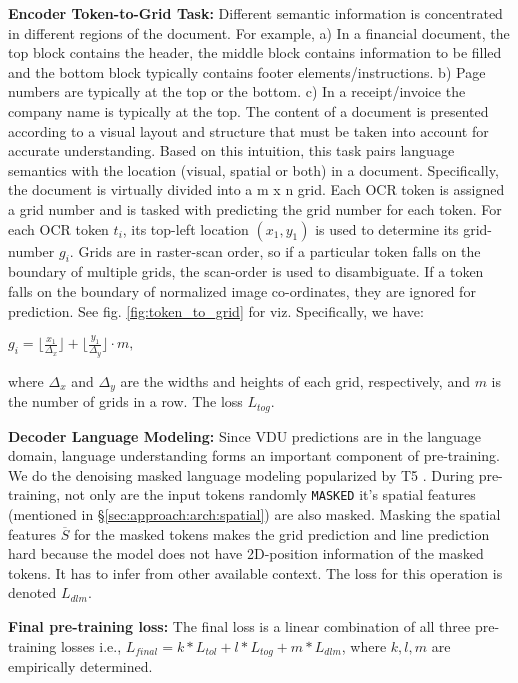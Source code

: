 \documentclass[10pt,twocolumn,letterpaper]{article}
\begin{document}
\label{sec:approach:pretrain:tok_to_grid}
\noindent\textbf{Encoder Token-to-Grid Task:} Different semantic information is concentrated in different regions of the document. For example, a) In a financial document, the top block contains the header, the middle block contains information to be filled and the bottom block typically contains footer elements/instructions. b) Page numbers are typically at the top or the bottom. c) In a receipt/invoice the company name is typically at the top. The content of a document is presented according to a visual layout and structure that must be taken into account for accurate understanding. Based on this intuition, this task pairs language semantics with the location (visual, spatial or both) in a document. Specifically, the document is virtually divided into a m x n grid. Each OCR token is assigned a grid number and \papertitleshort is tasked with predicting the grid number for each token. For each OCR token $t_i$, its top-left location $(x_1, y_1)$ is used to determine its grid-number $g_i$. Grids are in raster-scan order, so if a particular token falls on the boundary of multiple grids, the scan-order is used to disambiguate. If a token falls on the boundary of normalized image co-ordinates, they are ignored for prediction. See fig. \ref{fig:token_to_grid} for viz. Specifically, we have: 

$g_i = \lfloor\frac{x_1}{\Delta_x}\rfloor + \lfloor\frac{y_1}{\Delta_y}\rfloor\cdot m,$

\noindent where $\Delta_x$ and $\Delta_y$ are the widths and heights of each grid, respectively, and $m$ is the number of grids in a row. The loss $L_{tog}$.





\noindent \textbf{Decoder Language Modeling:} Since VDU predictions are in the language domain, language understanding forms an important component of \papertitleshort pre-training. We do the denoising masked language modeling popularized by T5 \cite{Raffel2019ExploringT5}.  During pre-training, not only are the input tokens randomly \verb|MASKED| it's spatial features (mentioned in \S \ref{sec:approach:arch:spatial}) are also masked. Masking the spatial features $\overline{S}$ for the masked tokens makes the grid prediction and line prediction hard because the model does not have 2D-position information of the masked tokens. It has to infer from other available context. The loss for this operation is denoted $L_{dlm}$.

\noindent \textbf{Final pre-training loss:} The final loss is a linear combination of all three pre-training losses i.e., $L_{final} = k * L_{tol} + l * L_{tog} + m * L_{dlm}$, where $k, l, m$ are empirically determined. 
\end{document}

